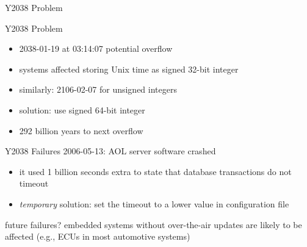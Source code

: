 \begin{frame}{Y2038 Problem }
	\begin{fancycolumns}
		\begin{definition}{Y2038 Problem}
			\begin{itemize}
				\item 2038-01-19 at 03:14:07 potential overflow
				\item systems affected storing Unix time as signed 32-bit integer
				\item similarly: 2106-02-07 for unsigned integers
				\item solution: use signed 64-bit integer
				\item 292 billion years to next overflow
			\end{itemize}
		\end{definition}
		\centering{}
		\nextcolumn
		\begin{example}{Y2038 Failures}
			2006-05-13: AOL server software crashed
			\begin{itemize}
				\item it used 1 billion seconds extra to state that database transactions do not timeout
				\item \emph{temporary} solution: set the timeout to a lower value in configuration file
			\end{itemize}
			future failures? embedded systems without over-the-air updates are likely to be affected (e.g., ECUs in most automotive systems)
		\end{example}
	\end{fancycolumns}
\end{frame}

